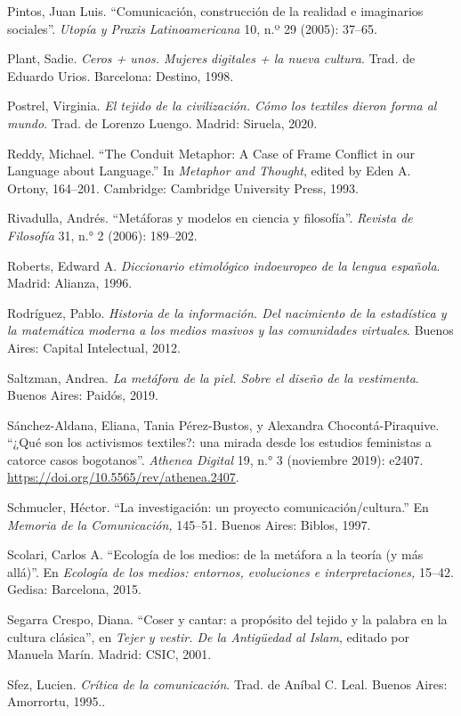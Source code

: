 \documentclass{tufte-handout}
\begin{document}
\begin{hangparas}{.25in}{1}
Pintos, Juan Luis. ``Comunicación, construcción de la realidad e
imaginarios sociales''. \emph{Utopía y Praxis Latinoamericana} 10, n.º
29 (2005): 37--65.

Plant, Sadie. \emph{Ceros + unos. Mujeres digitales + la nueva cultura}.
Trad. de Eduardo Urios. Barcelona: Destino, 1998.

Postrel, Virginia. \emph{El tejido de la civilización. Cómo los textiles
dieron forma al mundo}. Trad. de Lorenzo Luengo. Madrid: Siruela, 2020.

Reddy, Michael. ``The Conduit Metaphor: A Case of Frame Conflict in our
Language about Language.'' In \emph{Metaphor and Thought}, edited by
Eden A. Ortony, 164--201. Cambridge: Cambridge University Press, 1993.

Rivadulla, Andrés. ``Metáforas y modelos en ciencia y filosofía''.
\emph{Revista de Filosofía} 31, n.° 2 (2006): 189--202.

Roberts, Edward A. \emph{Diccionario etimológico indoeuropeo de la
lengua española}. Madrid: Alianza, 1996.

Rodríguez, Pablo. \emph{Historia de la información. Del nacimiento de la
estadística y la matemática moderna a los medios masivos y las
comunidades virtuales}. Buenos Aires: Capital Intelectual, 2012.

Saltzman, Andrea. \emph{La metáfora de la piel. Sobre el diseño de la
vestimenta}. Buenos Aires: Paidós, 2019.

Sánchez-Aldana, Eliana, Tania Pérez-Bustos, y Alexandra
Chocontá-Piraquive. ``¿Qué son los activismos textiles?: una mirada
desde los estudios feministas a catorce casos bogotanos''. \emph{Athenea
Digital} 19, n.° 3 (noviembre 2019): e2407.
\url{https://doi.org/10.5565/rev/athenea.2407}.

Schmucler, Héctor. ``La investigación: un proyecto
comunicación/cultura.'' En \emph{Memoria de la Comunicación, }145--51.
Buenos Aires: Biblos, 1997.

Scolari, Carlos A. ``Ecología de los medios: de la metáfora a la teoría
(y más allá)''. En \emph{Ecología de los medios: entornos, evoluciones e
interpretaciones, }15--42. Gedisa: Barcelona, 2015.

Segarra Crespo, Diana. ``Coser y cantar: a propósito del tejido y la
palabra en la cultura clásica'', en \emph{Tejer y vestir. De la
Antigüedad al Islam}, editado por Manuela Marín. Madrid: CSIC, 2001.

Sfez, Lucien. \emph{Crítica de la comunicación}. Trad. de Aníbal C.
Leal. Buenos Aires: Amorrortu, 1995..


\end{hangparas}
\end{document}
